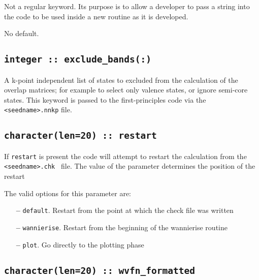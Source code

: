 Not a regular keyword. Its purpose is to allow a developer to pass a
string into the code to be used inside a new routine as it is developed.

No default.

%
%


\subsection[exclude\_bands]{\tt integer :: exclude\_bands(:)}

A k-point independent list of states to excluded from the calculation of the overlap matrices;
 for example to select only valence states, or ignore semi-core states.
 This keyword is passed to the first-principles code via the
 {\tt <seedname>.nnkp} file. 

\subsection[restart]{\tt character(len=20) :: restart}

If \verb#restart# is present the code will attempt to restart the calculation
from the {\tt <seedname>.chk } file. The value of the parameter
determines the position of the restart

The valid options for this parameter are:
\begin{itemize}
\item[{\bf --}]  \verb#default#. Restart from the point at which the
  check file was written  
\item[{\bf --}]  \verb#wannierise#. Restart from the beginning of the
  wannierise routine 
\item[{\bf --}]  \verb#plot#. Go directly to the plotting phase 


\end{itemize}



\subsection[wvfn\_formated]{\tt character(len=20) :: wvfn\_formatted}

